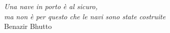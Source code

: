 \begin{titlepage}

\nonumber
\null {}
	\begin{flushright}
\textit{Una nave in porto è al sicuro, \\
ma non è per questo che le navi sono state costruite} \\[5mm]
	Benazir Bhutto
	\end{flushright}
\null

\end{titlepage}
\cleardoublepage